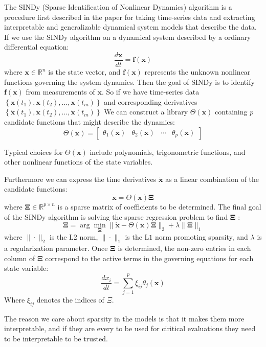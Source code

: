 The SINDy (Sparse Identification of Nonlinear Dynamics) algorithm is a procedure first described in the paper \cite{Brunton_2016} for taking time-series data and extracting interpretable and generalizable dynamical system models that describe the data. If we use the SINDy algorithm on a dynamical system described by a ordinary differential equation:
$$
\frac{d \mathbf{x}}{d t}=\mathbf{f}(\mathbf{x})
$$
where $\mathbf{x} \in \mathbb{R}^n$ is the state vector, and $\mathbf{f}(\mathbf{x})$ represents the unknown nonlinear functions governing the system dynamics. Then the goal of SINDy is to identify $\mathbf{f}(\mathbf{x})$ from measurements of $\mathbf{x}$.
So if we have time-series data $\left\{\mathbf{x}\left(t_1\right), \mathbf{x}\left(t_2\right), \ldots, \mathbf{x}\left(t_m\right)\right\}$ and corresponding derivatives $\left\{\dot{\mathbf{x}}\left(t_1\right), \dot{\mathbf{x}}\left(t_2\right), \ldots, \dot{\mathbf{x}}\left(t_m\right)\right\}$ We can construct a library $\Theta(\mathbf{x})$ containing $p$ candidate functions that might describe the dynamics:
$$
\Theta(\mathbf{x})=\left[\begin{array}{llll}
\theta_1(\mathbf{x}) & \theta_2(\mathbf{x}) & \cdots & \theta_p(\mathbf{x})
\end{array}\right]
$$

Typical choices for $\Theta(\mathbf{x})$ include polynomials, trigonometric functions, and other nonlinear functions of the state variables. 

Furthermore we can express the time derivatives $\dot{\mathbf{x}}$ as a linear combination of the candidate functions:
$$
\dot{\mathbf{x}}=\Theta(\mathbf{x}) \boldsymbol{\Xi}
$$
where $\boldsymbol{\Xi} \in \mathbb{R}^{p \times n}$ is a sparse matrix of coefficients to be determined. The final goal of the SINDy algorithm is solving the sparse regression problem to find $\boldsymbol{\Xi}$ :
$$
\boldsymbol{\Xi}=\arg \min _{\boldsymbol{\Xi}}\|\dot{\mathbf{x}}-\Theta(\mathbf{x}) \boldsymbol{\Xi}\|_2+\lambda\|\boldsymbol{\Xi}\|_1
$$
where $\|\cdot\|_2$ is the $\mathrm{L} 2$ norm, $\|\cdot\|_1$ is the $\mathrm{L} 1$ norm promoting sparsity, and $\lambda$ is a regularization parameter. Once $\boldsymbol{\Xi}$ is determined, the non-zero entries in each column of $\boldsymbol{\Xi}$ correspond to the active terms in the governing equations for each state variable:
$$
\frac{d x_i}{d t}=\sum_{j=1}^p \xi_{ij} \theta_j(\mathbf{x})
$$
Where $\xi_{ij}$ denotes the indices of $\Xi$.

The reason we care about sparsity in the models is that it makes them more interpretable, and if they are every to be used for ciritical evaluations they need to be interpretable to be trusted.

